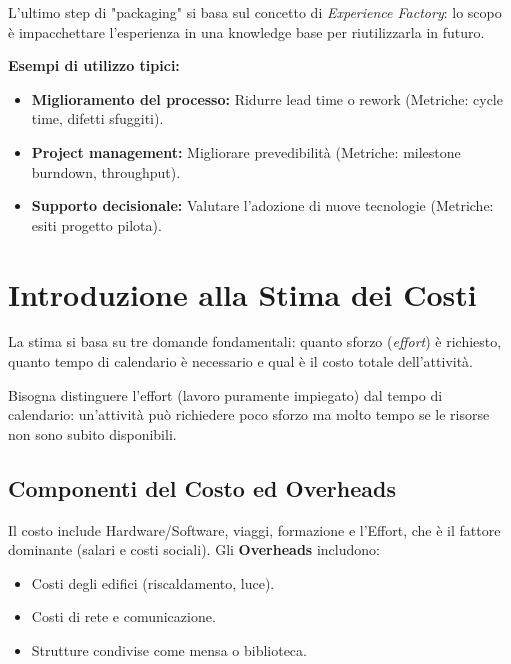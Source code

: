 \begin{notaprof}
L'ultimo step di "packaging" si basa sul concetto di \textit{Experience Factory}: lo scopo è impacchettare l'esperienza in una knowledge base per riutilizzarla in futuro.
\end{notaprof}

\begin{notaslide}
\textbf{Esempi di utilizzo tipici:}
\begin{itemize}
    \item \textbf{Miglioramento del processo:} Ridurre lead time o rework (Metriche: cycle time, difetti sfuggiti).
    \item \textbf{Project management:} Migliorare prevedibilità (Metriche: milestone burndown, throughput).
    \item \textbf{Supporto decisionale:} Valutare l'adozione di nuove tecnologie (Metriche: esiti progetto pilota).
\end{itemize}
\end{notaslide}

\section{Introduzione alla Stima dei Costi}
La stima si basa su tre domande fondamentali: quanto sforzo (\textit{effort}) è richiesto, quanto tempo di calendario è necessario e qual è il costo totale dell'attività.

\begin{notaprof}
Bisogna distinguere l'effort (lavoro puramente impiegato) dal tempo di calendario: un'attività può richiedere poco sforzo ma molto tempo se le risorse non sono subito disponibili.
\end{notaprof}

\subsection{Componenti del Costo ed Overheads}
Il costo include Hardware/Software, viaggi, formazione e l'Effort, che è il fattore dominante (salari e costi sociali). Gli \textbf{Overheads} includono:
\begin{itemize}
    \item Costi degli edifici (riscaldamento, luce).
    \item Costi di rete e comunicazione.
    \item Strutture condivise come mensa o biblioteca.
\end{itemize}

